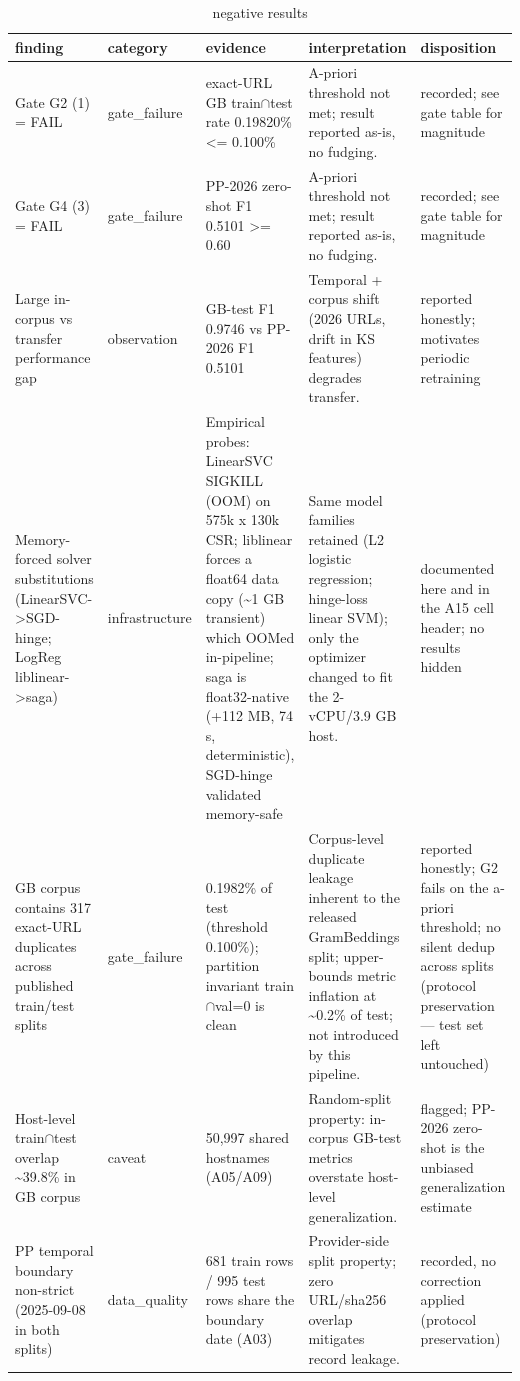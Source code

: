 \begin{table}[htbp]
\caption{negative results}
\label{tab:negative_results}
\begin{tabular}{lllll}
\toprule
finding & category & evidence & interpretation & disposition \\
\midrule
Gate G2 (1) = FAIL & gate\_failure & exact-URL GB train$\cap$test rate 0.19820\% <= 0.100\% & A-priori threshold not met; result reported as-is, no fudging. & recorded; see gate table for magnitude \\
Gate G4 (3) = FAIL & gate\_failure & PP-2026 zero-shot F1 0.5101 >= 0.60 & A-priori threshold not met; result reported as-is, no fudging. & recorded; see gate table for magnitude \\
Large in-corpus vs transfer performance gap & observation & GB-test F1 0.9746 vs PP-2026 F1 0.5101 & Temporal + corpus shift (2026 URLs, drift in KS features) degrades transfer. & reported honestly; motivates periodic retraining \\
Memory-forced solver substitutions (LinearSVC->SGD-hinge; LogReg liblinear->saga) & infrastructure & Empirical probes: LinearSVC SIGKILL (OOM) on 575k x 130k CSR; liblinear forces a float64 data copy (\textasciitilde{}1 GB transient) which OOMed in-pipeline; saga is float32-native (+112 MB, 74 s, deterministic), SGD-hinge validated memory-safe & Same model families retained (L2 logistic regression; hinge-loss linear SVM); only the optimizer changed to fit the 2-vCPU/3.9 GB host. & documented here and in the A15 cell header; no results hidden \\
GB corpus contains 317 exact-URL duplicates across published train/test splits & gate\_failure & 0.1982\% of test (threshold 0.100\%); partition invariant train$\cap$val=0 is clean & Corpus-level duplicate leakage inherent to the released GramBeddings split; upper-bounds metric inflation at \textasciitilde{}0.2\% of test; not introduced by this pipeline. & reported honestly; G2 fails on the a-priori threshold; no silent dedup across splits (protocol preservation --- test set left untouched) \\
Host-level train$\cap$test overlap \textasciitilde{}39.8\% in GB corpus & caveat & 50,997 shared hostnames (A05/A09) & Random-split property: in-corpus GB-test metrics overstate host-level generalization. & flagged; PP-2026 zero-shot is the unbiased generalization estimate \\
PP temporal boundary non-strict (2025-09-08 in both splits) & data\_quality & 681 train rows / 995 test rows share the boundary date (A03) & Provider-side split property; zero URL/sha256 overlap mitigates record leakage. & recorded, no correction applied (protocol preservation) \\

\end{tabular}
\end{table}
